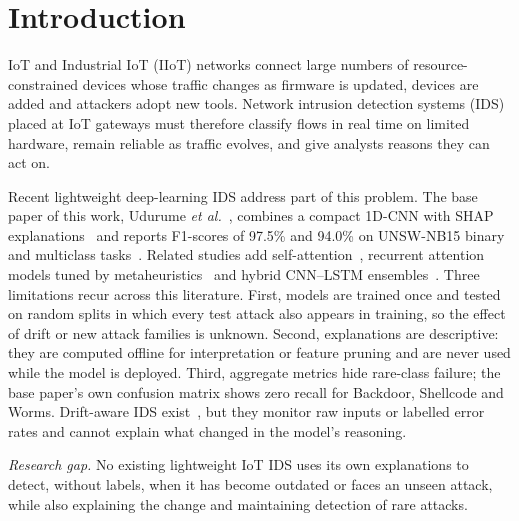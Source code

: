 \documentclass[pdflatex,sn-mathphys-num]{sn-jnl}%
\begin{document}
\section{Introduction}
IoT and Industrial IoT (IIoT) networks connect large numbers of resource-constrained devices whose traffic changes as firmware is updated, devices are added and attackers adopt new tools. Network intrusion detection systems (IDS) placed at IoT gateways must therefore classify flows in real time on limited hardware, remain reliable as traffic evolves, and give analysts reasons they can act on.

Recent lightweight deep-learning IDS address part of this problem. The base paper of this work, Udurume \textit{et al.}~\cite{udurume2026}, combines a compact 1D-CNN with SHAP explanations~\cite{lundberg2017} and reports F1-scores of 97.5\% and 94.0\% on UNSW-NB15 binary and multiclass tasks~\cite{moustafa2015}. Related studies add self-attention~\cite{sharma2025}, recurrent attention models tuned by metaheuristics~\cite{nasir2026,guo2026} and hybrid CNN--LSTM ensembles~\cite{chen2026}. Three limitations recur across this literature. First, models are trained once and tested on random splits in which every test attack also appears in training, so the effect of drift or new attack families is unknown. Second, explanations are descriptive: they are computed offline for interpretation or feature pruning and are never used while the model is deployed. Third, aggregate metrics hide rare-class failure; the base paper's own confusion matrix shows zero recall for Backdoor, Shellcode and Worms. Drift-aware IDS exist~\cite{obaidat2026,aly2025,agbedanu2025}, but they monitor raw inputs or labelled error rates and cannot explain what changed in the model's reasoning.

\textit{Research gap.} No existing lightweight IoT IDS uses its own explanations to detect, without labels, when it has become outdated or faces an unseen attack, while also explaining the change and maintaining detection of rare attacks.
\end{document}
